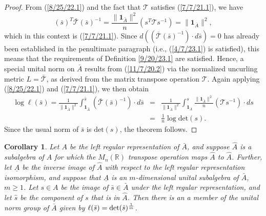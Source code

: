 \documentclass{amsart}
\numberwithin{equation}{section}
\newtheorem{corollary}[theorem]{Corollary}
\theoremstyle{definition}
\numberwithin{theorem}{section}
\begin{document}
\begin{proof}
 From (\ref{8/25/22.1}) and the fact that $\mathcal{T}$ satisfies (\ref{7/7/21.1}), we have \begin{equation}\label{9/27/23.1} (\bar{s})^T \bar{\mathcal{T}} (\bar{s})^{-1} = \frac{\|\mathbf{1}_{\bar{A}}\|^2}{n}( s^T \mathcal{T} s^{-1}) = \|\mathbf{1}_{\bar{A}}\|^2 ,\end{equation}
which in this context is (\ref{7/7/21.1}).
  Since $d((\bar{\mathcal{T}}(\bar{s})^{-1})\cdot d\bar{s}) = 0$ has already been established in the penultimate paragraph (i.e., (\ref{4/7/23.1}) is satisfied), this means that the requirements of Definition \ref{9/20/23.1}  are satisfied.  Hence, a special unital norm on $\bar{A}$ results from (\ref{11/7/20.2})  via the normalized uncurling metric $L = \bar{\mathcal{T}}$, as derived from the matrix transpose operation $\mathcal{T}$. 
 Again applying (\ref{8/25/22.1}) and (\ref{7/7/21.1}),  we then obtain 
 \begin{eqnarray}\nonumber \log\ell(\bar{s}) = \frac{1}{\|\mathbf{1}_{\bar{A}}\|^2} \int_{\mathbf{1}_{\bar{A}}}^{\bar{s}} (\bar{\mathcal{T}}(\bar{s})^{-1})\cdot d\bar{s}
 &=& \frac{1}{\|\mathbf{1}_{\bar{A}}\|^2} \int_{\mathbf{1}_{A}}^{s} \frac{\|\mathbf{1}_{\bar{A}}\|^2}{n}(\mathcal{T}s^{-1})\cdot ds \\ &=& \frac{1}{n} \log\text{det}(s).\label{9/27/23.2}\end{eqnarray}
Since the usual norm of $\bar{s}$ is $\text{det}(s)$, the theorem follows. 
 \end{proof} 
 
 \begin{corollary}\label{11/17/22.1} Let $A$ be the left regular representation of $\bar{A}$, and suppose $\hat{A}$ is a subalgebra of $A$ for which the $ M_n(\mathbb{R})$ transpose operation maps $\hat{A}$ to $\hat{A}$.  Further, let $\underline{A}$ be the inverse image of $\hat{A}$ with respect to the left regular representation isomorphism, and suppose that $\underline{A}$ is an $m$-dimensional unital subalgebra of $\bar{A}$, $m\ge 1$. Let $s\in A$ be the image of $\bar{s}\in \bar{A}$ under the left regular representation, and let $\hat{s}$ be the component of $s$ that is in $\hat{A}$.  Then there is an a member of the unital norm group of $\bar{A}$ given by $\ell(\bar{s}) = \text{\rm det}(\hat{s})^{\frac{1}{m}}$.  \end{corollary}
 
\end{document}

